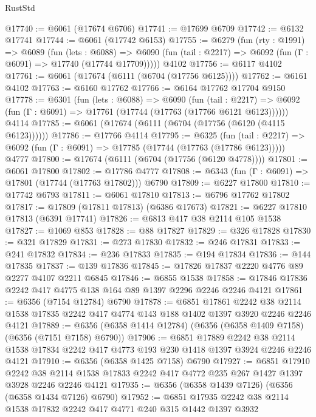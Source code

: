 \begin{lexlean}{RustStd}
\begin{coremodule}
@17740 := @6061 (@17674 @6706)
@17741 := @17699 @6709
@17742 := @6132 @17741
@17744 := @6061 (@17742 @6153)
@17755 := @6279
    (fun (rty : @1991) =>
    @6089
      (fun (lets : @6088) =>
      @6090 (fun (tail : @2217) => @6092 (fun (Γ : @6091) => @17740 (@17744 @17709)))))
    @4102
@17756 := @6117 @4102
@17761 := @6061 (@17674 (@6111 (@6704 (@17756 @6125))))
@17762 := @6161 @4102
@17763 := @6160 @17762
@17766 := @6164 @17762 @17704 @9150
@17778 := @6301
    (fun (lets : @6088) =>
    @6090
      (fun (tail : @2217) =>
      @6092 (fun (Γ : @6091) => @17761 (@17744 (@17763 (@17766 @6121 @6123))))))
    @4114
@17785 := @6061 (@17674 (@6111 (@6704 (@17756 (@6120 (@4115 @6123))))))
@17786 := @17766 @4114
@17795 := @6325
    (fun (tail : @2217) => @6092 (fun (Γ : @6091) => @17785 (@17744 (@17763 (@17786 @6123)))))
    @4777
@17800 := @17674 (@6111 (@6704 (@17756 (@6120 @4778))))
@17801 := @6061 @17800
@17802 := @17786 @4777
@17808 := @6343 (fun (Γ : @6091) => @17801 (@17744 (@17763 @17802))) @6790
@17809 := @6227 @17800
@17810 := @17742 @6793
@17811 := @6061 @17810
@17813 := @6796 @17762 @17802
@17817 := @17809 (@17811 @17813) (@6386 @17673)
@17821 := @6227 @17810 @17813 (@6391 @17741)
@17826 := @6813 @417 @38 @2114 @105 @1538
@17827 := @1069 @853
@17828 := @88 @17827
@17829 := @326 @17828
@17830 := @321 @17829
@17831 := @273 @17830
@17832 := @246 @17831
@17833 := @241 @17832
@17834 := @236 @17833
@17835 := @194 @17834
@17836 := @144 @17835
@17837 := @139 @17836
@17845 := @17826 @17837 @2220 @4776 @89 @2277 @4107 @2211 @6845
@17846 := @6855 @1538
@17858 := @17846 @17836 @2242 @417 @4775 @138 @164 @89 @1397 @2296 @2246 @2246 @4121
@17861 := @6356 (@7154 @12784) @6790
@17878 := @6851
    @17861
    @2242
    @38
    @2114
    @1538
    @17835
    @2242
    @417
    @4774
    @143
    @188
    @1402
    @1397
    @3920
    @2246
    @2246
    @4121
@17889 := @6356 (@6358 @1414 @12784) (@6356 (@6358 @1409 @7158) (@6356 (@7151 @7158) @6790))
@17906 := @6851
    @17889
    @2242
    @38
    @2114
    @1538
    @17834
    @2242
    @417
    @4773
    @193
    @230
    @1418
    @1397
    @3924
    @2246
    @2246
    @4121
@17910 := @6356 (@6358 @1425 @7158) @6790
@17927 := @6851
    @17910
    @2242
    @38
    @2114
    @1538
    @17833
    @2242
    @417
    @4772
    @235
    @267
    @1427
    @1397
    @3928
    @2246
    @2246
    @4121
@17935 := @6356 (@6358 @1439 @7126) (@6356 (@6358 @1434 @7126) @6790)
@17952 := @6851
    @17935
    @2242
    @38
    @2114
    @1538
    @17832
    @2242
    @417
    @4771
    @240
    @315
    @1442
    @1397
    @3932

\end{coremodule}
\end{lexlean}
